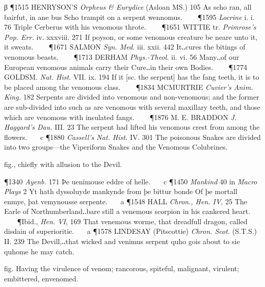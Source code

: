 \begin{description}[wide, labelwidth=!, labelindent=0pt]
\begin{myenumerate}
β \P 1515 HENRYSON'S  \textit{Orpheus \& Eurydice} (Asloan MS.) 105 As scho ran, all bairfut, in ane bus Scho trampit on a serpent wennomus.    
\P 1595 \textit{Locrine}  i. i. 76 Triple Cerberus with his venomous throte.    
\P 1651 WITTIE tr.  \textit{Primrose's Pop. Err.} iv. xxxviii. 271 If poyson, or some venomous creature be neare unto it, it sweats.    
\P 1671 SALMON  \textit{Syn. Med.} iii. xxii. 442 It‥cures the bitings of venomous beasts.    
\P 1713 DERHAM  \textit{Phys.-Theol.} ii. vi. 56 Many‥of our European venomous animals carry their Cure‥in their own Bodies.    
\P 1774 GOLDSM.  \textit{Nat. Hist.} VII. ix. 194 If it [sc. the serpent] has the fang teeth, it is to be placed among the venomous class.    
\P 1834 MCMURTRIE  \textit{Cuvier's Anim. King.} 182 Serpents are divided into venomous and non-venomous; and the former are sub-divided into such as are venomous with several maxillary teeth, and those which are venomous with insulated fangs.    
\P 1876 M. E. BRADDON  \textit{J. Haggard's Dau.} III. 23 The serpent had lifted his venomous crest from among the flowers.    c 
\P 1880  \textit{Cassell's Nat. Hist.} IV. 301 The poisonous Snakes are divided into two groups—the Viperiform Snakes and the Venomous Colubrines.

 fig., chiefly with allusion to the Devil.

\P 1340  \textit{Ayenb.} 171 Þe uenimouse eddre of helle.    c 
\P 1450 \textit{Mankind} 40 in  \textit{Macro Plays} 2 Yt hath dyssoluyde mankynde from þe bittur bonde Of þe mortall enmye, þat vemynousse serpente.    a 
\P 1548 HALL  \textit{Chron., Hen. IV}, 25 The Earle of Northumberland‥bare still a venemous scorpion in his cankered heart.    
\P Ibid., \textit{Hen. VI}, 169 That venemous worme, that dreadfull dragon, called disdain of superioritie.    a 
\P 1578 LINDESAY  (Pitscottie) \textit{Chron. Scot.} (S.T.S.) II. 239 The Devill,‥that wicked and venimus serpent quho gois about to sie quhome he may catch.

 fig. Having the virulence of venom; rancorous, spiteful, malignant, virulent; embittered, envenomed.


\end{myenumerate}
\end{description}
